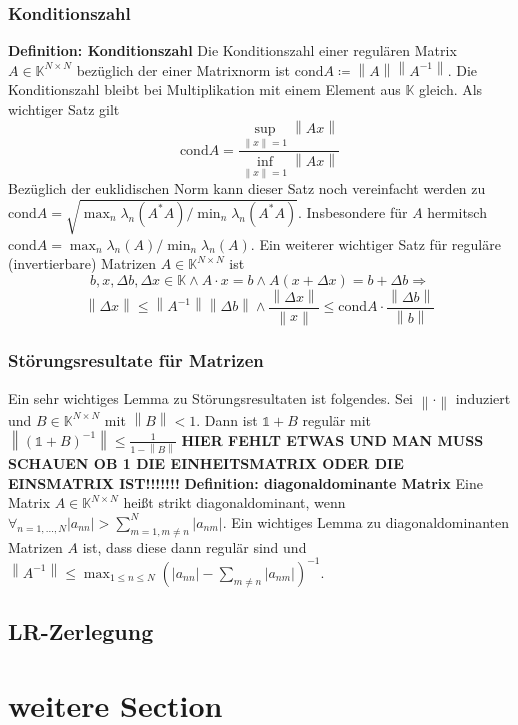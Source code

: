 \documentclass{article}
\newcommand\norm[1]{\left\lVert#1\right\rVert}
\begin{document}
\subsubsection{Konditionszahl}
    \textbf{Definition: Konditionszahl}\newline
    Die Konditionszahl einer regulären Matrix $A\in \mathbb{K}^{N\times N}$ bezüglich der einer Matrixnorm ist $\textrm{cond} A \coloneqq  \norm{A} \norm{A^{-1}}$.\newline
    Die Konditionszahl bleibt bei Multiplikation mit einem Element aus $\mathbb{K}$ gleich.\newline
    Als wichtiger Satz gilt 
    \begin{equation}
        \textrm{cond} A =\frac{\sup_{\norm{x}=1}\norm{Ax}}{\inf_{\norm{x}=1}\norm{Ax}}
    \end{equation}
    Bezüglich der euklidischen Norm kann dieser Satz noch vereinfacht werden zu $\textrm{cond} A = \sqrt{\max_n\lambda_n(A^*A)/\min_n\lambda_n(A^*A)}$. Insbesondere für $A$ hermitsch $\textrm{cond} A = \max_n\lambda_n(A)/\min_n\lambda_n(A)$.
    Ein weiterer wichtiger Satz für reguläre (invertierbare) Matrizen $A\in \mathbb{K}^{N\times N}$ ist 
    \begin{equation}
        b,x,\Delta b,\Delta x\in \mathbb{K} \wedge A\cdot x=b\wedge A(x+\Delta x)=b + \Delta b \Rightarrow 
    \end{equation}
    \begin{equation*}
        \norm{\Delta x}\le \norm{A^{-1}} \norm{\Delta b}\wedge \frac{\norm{\Delta x}}{\norm{x}} \le \textrm{cond} A \cdot  \frac{\norm{\Delta b}}{\norm{b}}
    \end{equation*}
\subsubsection{Störungsresultate für Matrizen}
    Ein sehr wichtiges Lemma zu Störungsresultaten ist folgendes. Sei $\norm{\cdot}$ induziert und $B\in \mathbb{K}^{N\times N}$ mit $\norm{B}<1$. Dann ist $\mathbb{1}+B$ regulär mit $\norm{(\mathbb{1}+B)^{-1}}\le \frac{1}{1-\norm{B}}$ \textbf{HIER FEHLT ETWAS UND MAN MUSS SCHAUEN OB 1 DIE EINHEITSMATRIX ODER DIE EINSMATRIX IST!!!!!!!}\newline
    \textbf{Definition: diagonaldominante Matrix}\newline
    Eine Matrix $A\in \mathbb{K}^{N\times N}$ heißt strikt diagonaldominant, wenn $\forall_{n=1,...,N}|a_{nn}|>\sum_{m=1,m\not = n}^N|a_{nm}|$.\newline 
    Ein wichtiges Lemma zu diagonaldominanten Matrizen $A$ ist, dass diese dann regulär sind und $\norm{A^{-1}}\le \max_{1\le n\le N}(|a_{nn}|-\sum_{m\not = n}|a_{nm}|)^{-1}$.
\subsection{LR-Zerlegung}

\newpage
\section{weitere Section}
\end{document}

